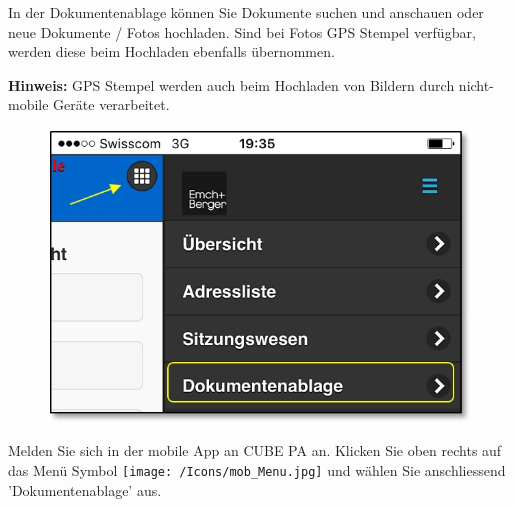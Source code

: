 \vspace{\baselineskip}

In der Dokumentenablage können Sie Dokumente suchen und anschauen oder neue Dokumente / Fotos hochladen. Sind bei Fotos GPS Stempel verfügbar, werden diese beim Hochladen ebenfalls übernommen. 

\vspace{\baselineskip}

\textbf{Hinweis:} GPS Stempel werden auch beim Hochladen von Bildern durch nicht-mobile Geräte verarbeitet.

\vspace{\baselineskip}

\begin{figure}   %
  \vspace{-35pt}      %
  \begin{center}
    \includegraphics[width=1\linewidth]{../chapters/11_Dokumentenablage/pictures/11-mob01_Dokumentenablage_oeffnen.jpg}
  \end{center}
  \vspace{-20pt}
  \vspace{-10pt}
\end{figure}

Melden Sie sich in der mobile App an CUBE PA an. Klicken Sie oben rechts auf das Menü Symbol \texttt{[image: /Icons/mob\_Menu.jpg]} und wählen Sie anschliessend 'Dokumentenablage' aus.

\vspace{2cm}

